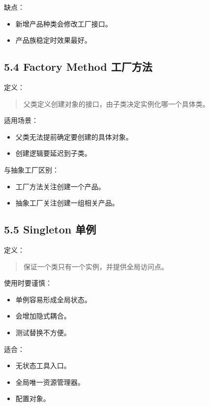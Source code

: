 \documentclass[UTF8,zihao=-4]{ctexart}
\begin{document}
缺点：

\begin{itemize}
\item 新增产品种类会修改工厂接口。
\item 产品族稳定时效果最好。
\end{itemize}

\subsection{5.4 Factory Method 工厂方法}

定义：

\begin{quote}
父类定义创建对象的接口，由子类决定实例化哪一个具体类。
\end{quote}

适用场景：

\begin{itemize}
\item 父类无法提前确定要创建的具体对象。
\item 创建逻辑要延迟到子类。
\end{itemize}

与抽象工厂区别：

\begin{itemize}
\item 工厂方法关注创建一个产品。
\item 抽象工厂关注创建一组相关产品。
\end{itemize}

\subsection{5.5 Singleton 单例}

定义：

\begin{quote}
保证一个类只有一个实例，并提供全局访问点。
\end{quote}

使用时要谨慎：

\begin{itemize}
\item 单例容易形成全局状态。
\item 会增加隐式耦合。
\item 测试替换不方便。
\end{itemize}

适合：

\begin{itemize}
\item 无状态工具入口。
\item 全局唯一资源管理器。
\item 配置对象。
\end{itemize}
\end{document}
